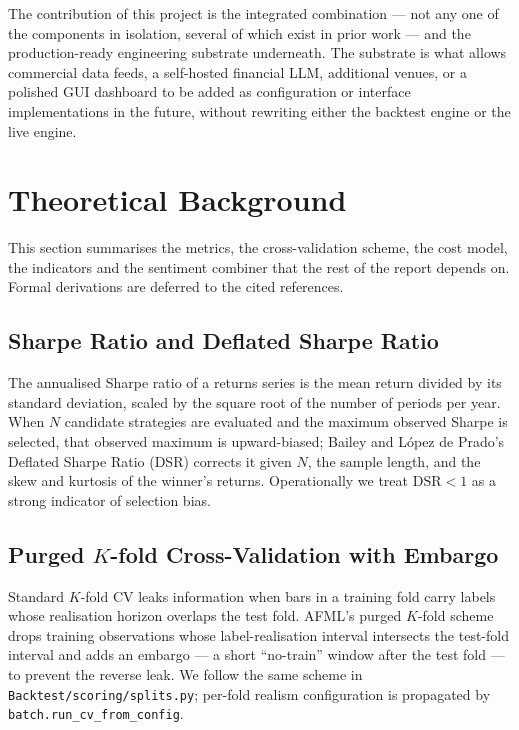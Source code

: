 \documentclass[a4paper, 12pt, titlepage]{article}
\begin{document}
The contribution of this project is the integrated combination ---
not any one of the components in isolation, several of which exist in
prior work --- and the production-ready engineering substrate
underneath. The substrate is what allows commercial data feeds, a
self-hosted financial LLM, additional venues, or a polished GUI
dashboard to be added as configuration or interface implementations
in the future, without rewriting either the backtest engine or the
live engine.

\newpage
\section{Theoretical Background}

This section summarises the metrics, the cross-validation scheme,
the cost model, the indicators and the sentiment combiner that the
rest of the report depends on. Formal derivations are deferred to
the cited references.

\subsection{Sharpe Ratio and Deflated Sharpe Ratio}

The annualised Sharpe ratio of a returns series is the mean return
divided by its standard deviation, scaled by the square root of the
number of periods per year. When $N$ candidate strategies are
evaluated and the maximum observed Sharpe is selected, that
observed maximum is upward-biased; Bailey and López de Prado's
Deflated Sharpe Ratio (DSR) \cite{bailey2014deflated} corrects it
given $N$, the sample length, and the skew and kurtosis of the
winner's returns. Operationally we treat $\mathrm{DSR}<1$ as a
strong indicator of selection bias.

\subsection{Purged $K$-fold Cross-Validation with Embargo}

Standard $K$-fold CV leaks information when bars in a training
fold carry labels whose realisation horizon overlaps the test
fold. AFML's purged $K$-fold scheme drops training observations
whose label-realisation interval intersects the test-fold interval
and adds an embargo --- a short ``no-train'' window after the test
fold --- to prevent the reverse leak. We follow the same scheme in
\texttt{Backtest/scoring/splits.py}; per-fold realism configuration
is propagated by \texttt{batch.run\_cv\_from\_config}.
\end{document}
